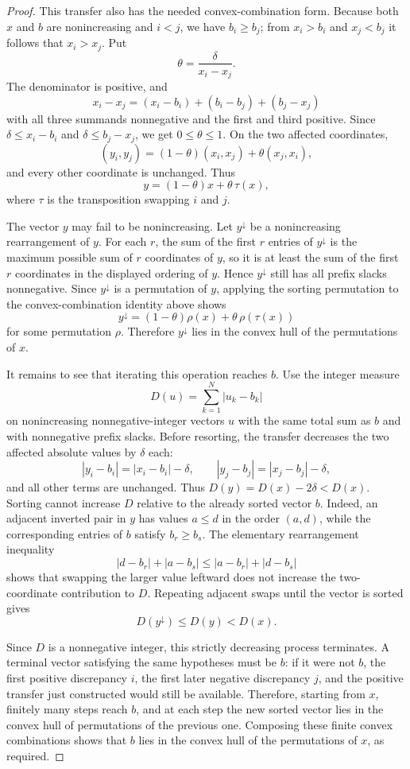 \begin{proof}
This transfer also has the needed convex-combination form.  Because both
\(x\) and \(b\) are nonincreasing and \(i<j\), we have \(b_i\ge b_j\); from
\(x_i>b_i\) and \(x_j<b_j\) it follows that \(x_i>x_j\).  Put
\[
\theta=\frac{\delta}{x_i-x_j}.
\]
The denominator is positive, and
\[
x_i-x_j=(x_i-b_i)+(b_i-b_j)+(b_j-x_j)
\]
with all three summands nonnegative and the first and third positive.  Since
\(\delta\le x_i-b_i\) and \(\delta\le b_j-x_j\), we get
\(0\le\theta\le1\).  On the two affected coordinates,
\[
(y_i,y_j)
=(1-\theta)(x_i,x_j)+\theta(x_j,x_i),
\]
and every other coordinate is unchanged.  Thus
\[
y=(1-\theta)x+\theta\,\tau(x),
\]
where \(\tau\) is the transposition swapping \(i\) and \(j\).

The vector \(y\) may fail to be nonincreasing.  Let \(y^\downarrow\) be a
nonincreasing rearrangement of \(y\).  For each \(r\), the sum of the first
\(r\) entries of \(y^\downarrow\) is the maximum possible sum of \(r\)
coordinates of \(y\), so it is at least the sum of the first \(r\)
coordinates in the displayed ordering of \(y\).  Hence
\(y^\downarrow\) still has all prefix slacks nonnegative.  Since
\(y^\downarrow\) is a permutation of \(y\), applying the sorting permutation
to the convex-combination identity above shows
\[
y^\downarrow
=(1-\theta)\rho(x)+\theta\,\rho(\tau(x))
\]
for some permutation \(\rho\).  Therefore \(y^\downarrow\) lies in the
convex hull of the permutations of \(x\).

It remains to see that iterating this operation reaches \(b\).  Use the
integer measure
\[
D(u)=\sum_{k=1}^N |u_k-b_k|
\]
on nonincreasing nonnegative-integer vectors \(u\) with the same total sum
as \(b\) and with nonnegative prefix slacks.  Before resorting, the transfer
decreases the two affected absolute values by \(\delta\) each:
\[
|y_i-b_i|=|x_i-b_i|-\delta,\qquad
|y_j-b_j|=|x_j-b_j|-\delta,
\]
and all other terms are unchanged.  Thus \(D(y)=D(x)-2\delta<D(x)\).
Sorting cannot increase \(D\) relative to the already sorted vector \(b\).
Indeed, an adjacent inverted pair in \(y\) has values \(a\le d\) in the
order \((a,d)\), while the corresponding entries of \(b\) satisfy
\(b_r\ge b_s\).  The elementary rearrangement inequality
\[
|d-b_r|+|a-b_s|\le |a-b_r|+|d-b_s|
\]
shows that swapping the larger value leftward does not increase the
two-coordinate contribution to \(D\).  Repeating adjacent swaps until the
vector is sorted gives
\[
D(y^\downarrow)\le D(y)<D(x).
\]

Since \(D\) is a nonnegative integer, this strictly decreasing process
terminates.  A terminal vector satisfying the same hypotheses must be
\(b\): if it were not \(b\), the first positive discrepancy \(i\), the first
later negative discrepancy \(j\), and the positive transfer just constructed
would still be available.  Therefore, starting from \(x\), finitely many
steps reach \(b\), and at each step the new sorted vector lies in the convex
hull of permutations of the previous one.  Composing these finite convex
combinations shows that \(b\) lies in the convex hull of the permutations of
\(x\), as required.
\end{proof}
